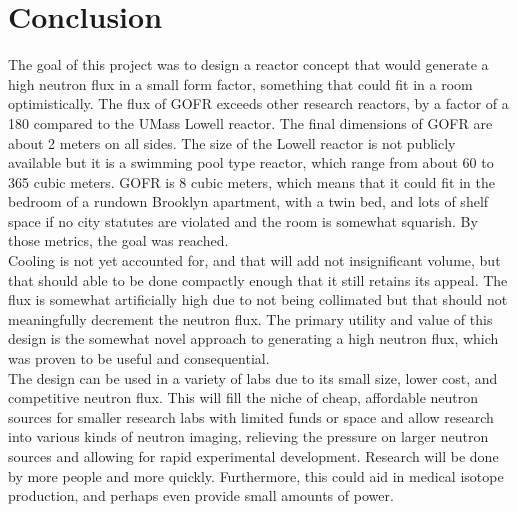 \section{Conclusion}
\label{sec:conclusion}

The goal of this project was to design a reactor concept that would generate a high neutron flux in a small form factor, something that could fit in a room optimistically. The flux of GOFR exceeds other research reactors, by a factor of a 180 compared to the UMass Lowell reactor. The final dimensions of GOFR are about 2 meters on all sides. The size of the Lowell reactor is not publicly available but it is a swimming pool type reactor, which range from about 60 to 365 cubic meters. GOFR is 8 cubic meters, which means that it could fit in the bedroom of a rundown Brooklyn apartment, with a twin bed, and lots of shelf space if no city statutes are violated and the room is somewhat squarish. By those metrics, the goal was reached.\\

Cooling is not yet accounted for, and that will add not insignificant volume, but that should able to be done compactly enough that it still retains its appeal. The flux is somewhat artificially high due to not being collimated but that should not meaningfully decrement the neutron flux. The primary utility and value of this design is the somewhat novel approach to generating a high neutron flux, which was proven to be useful and consequential.\\

The design can be used in a variety of labs due to its small size, lower cost, and competitive neutron flux. This will fill the niche of cheap, affordable neutron sources for smaller research labs with limited funds or space and allow research into various kinds of neutron imaging, relieving the pressure on larger neutron sources and allowing for rapid experimental development. Research will be done by more people and more quickly. Furthermore, this could aid in medical isotope production, and perhaps even provide small amounts of power.\\